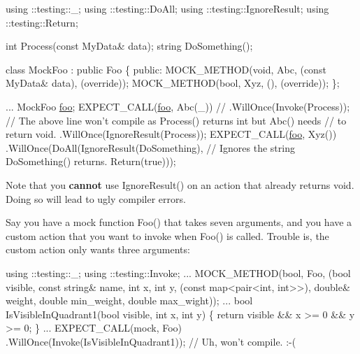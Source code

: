 \begin{DoxyCode}
using ::testing::\_;
using ::testing::DoAll;
using ::testing::IgnoreResult;
using ::testing::Return;

\textcolor{keywordtype}{int} Process(\textcolor{keyword}{const} MyData& data);
\textcolor{keywordtype}{string} DoSomething();

\textcolor{keyword}{class }MockFoo : \textcolor{keyword}{public} Foo \{
 \textcolor{keyword}{public}:
  MOCK\_METHOD(\textcolor{keywordtype}{void}, Abc, (\textcolor{keyword}{const} MyData& data), (\textcolor{keyword}{override}));
  MOCK\_METHOD(\textcolor{keywordtype}{bool}, Xyz, (), (\textcolor{keyword}{override}));
\};

  ...
  MockFoo \mbox{\hyperlink{namespacefoo}{foo}};
  EXPECT\_CALL(\mbox{\hyperlink{namespacefoo}{foo}}, Abc(\_))
      \textcolor{comment}{// .WillOnce(Invoke(Process));}
      \textcolor{comment}{// The above line won't compile as Process() returns int but Abc() needs}
      \textcolor{comment}{// to return void.}
      .WillOnce(IgnoreResult(Process));
  EXPECT\_CALL(\mbox{\hyperlink{namespacefoo}{foo}}, Xyz())
      .WillOnce(DoAll(IgnoreResult(DoSomething),
                      \textcolor{comment}{// Ignores the string DoSomething() returns.}
                      Return(\textcolor{keyword}{true})));
\end{DoxyCode}


Note that you {\bfseries cannot} use {\ttfamily Ignore\+Result()} on an action that already returns {\ttfamily void}. Doing so will lead to ugly compiler errors.

Say you have a mock function {\ttfamily Foo()} that takes seven arguments, and you have a custom action that you want to invoke when {\ttfamily Foo()} is called. Trouble is, the custom action only wants three arguments\+:


\begin{DoxyCode}
using ::testing::\_;
using ::testing::Invoke;
...
  MOCK\_METHOD(\textcolor{keywordtype}{bool}, Foo,
              (\textcolor{keywordtype}{bool} visible, \textcolor{keyword}{const} \textcolor{keywordtype}{string}& name, \textcolor{keywordtype}{int} x, \textcolor{keywordtype}{int} y,
               (\textcolor{keyword}{const} map<pair<int, int>>), \textcolor{keywordtype}{double}& weight, \textcolor{keywordtype}{double} min\_weight,
               \textcolor{keywordtype}{double} max\_wight));
...
bool IsVisibleInQuadrant1(\textcolor{keywordtype}{bool} visible, \textcolor{keywordtype}{int} x, \textcolor{keywordtype}{int} y) \{
  \textcolor{keywordflow}{return} visible && x >= 0 && y >= 0;
\}
...
  EXPECT\_CALL(mock, Foo)
      .WillOnce(Invoke(IsVisibleInQuadrant1));  \textcolor{comment}{// Uh, won't compile. :-(}
\end{DoxyCode}


